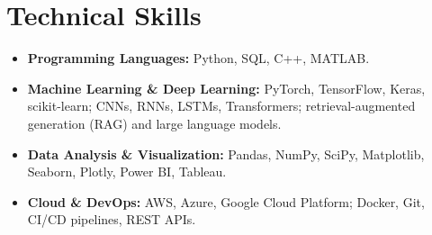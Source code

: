 \documentclass[11pt,letterpaper]{article}
\begin{document}
\section{Technical Skills}
\begin{itemize}
  \item \textbf{Programming Languages:} Python, SQL, C++, MATLAB.
  \item \textbf{Machine Learning \& Deep Learning:} PyTorch, TensorFlow, Keras, scikit-learn; CNNs, RNNs, LSTMs, Transformers; retrieval-augmented generation (RAG) and large language models.
  \item \textbf{Data Analysis \& Visualization:} Pandas, NumPy, SciPy, Matplotlib, Seaborn, Plotly, Power BI, Tableau.
  \item \textbf{Cloud \& DevOps:} AWS, Azure, Google Cloud Platform; Docker, Git, CI/CD pipelines, REST APIs.
\end{itemize}
\end{document}
